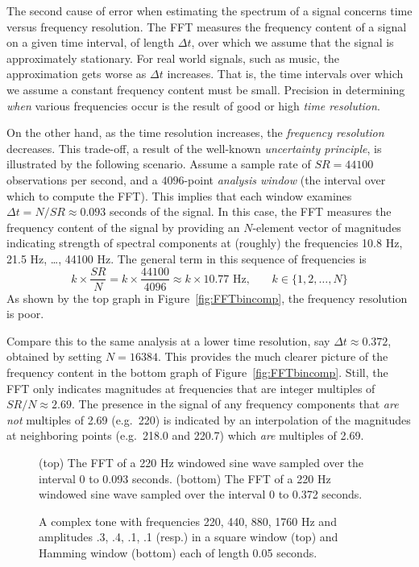 The second cause of error when estimating the spectrum of a signal
concerns time versus frequency resolution.  The FFT measures the
frequency content of a signal on a given time interval, of length
$\Delta t$, over which we assume that the signal is approximately
stationary.  For real world signals, such as music, the approximation
gets worse as $\Delta t$ increases.  That is, the time intervals over
which we assume a constant frequency content must be small.
Precision in determining \emph{when} various frequencies
occur is the result of good or high \emph{time resolution}.

On the other hand, as the time resolution increases, the \emph{frequency
resolution} decreases.  This trade-off, a result of the well-known
\emph{uncertainty principle}, is illustrated by the following
scenario.  Assume a sample rate of $SR = 44100$ observations per second,
and a $4096$-point \emph{analysis window} (the interval over which to
compute the FFT).  This implies that each window examines $\Delta t =
N/SR \approx 0.093$ seconds of the signal.  In this case, the FFT measures
the frequency content of the signal by providing an $N$-element
vector of magnitudes indicating strength of spectral components at
(roughly) the frequencies {10.8 Hz, 21.5 Hz, \ldots, 44100 Hz}. The
general term in this sequence of frequencies is 
\[ 
k\times \frac{SR}{N} = k \times \frac{44100}{4096} 
		\approx k \times 10.77\text{ Hz,}
		\qquad  k\in\{1,2,\ldots, N\}
\] 
As shown by the top graph in Figure~\ref{fig:FFTbincomp}, the
frequency resolution is poor. 

Compare this to the same analysis at a lower time resolution, say
$\Delta t \approx 0.372$, obtained by setting $N= 16384$. This
provides the much clearer picture of the frequency content in the
bottom graph of Figure~\ref{fig:FFTbincomp}.  Still, the FFT only
indicates magnitudes at frequencies that are integer multiples of
$SR/N \approx 2.69$.  The presence in the signal of any frequency
components that \emph{are not} multiples of 2.69 (e.g.~220) is indicated by an
interpolation of the magnitudes at neighboring points (e.g.~218.0 and
220.7) which \emph{are} multiples of 2.69.
\begin{figure}
  \caption{{\small (top) The FFT of a 220 Hz windowed sine wave sampled over the
  interval 0 to 0.093 seconds. (bottom) The FFT of a 220 Hz windowed
  sine wave sampled over the interval 0 to  0.372 seconds.}  }
  \label{fig:FFTbincomp}
  
  \caption{{\small A complex tone with frequencies 220, 440, 880, 1760 Hz and
  amplitudes .3, .4, .1, .1 (resp.) in a square window (top) and Hamming
  window (bottom) each of length 0.05 seconds.} }
  \label{fig:CompTone2200}
\end{figure}
  
